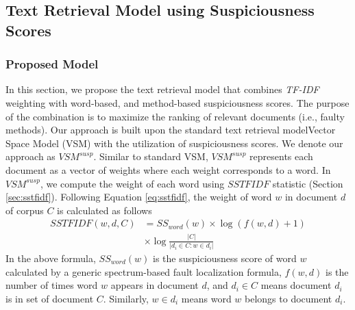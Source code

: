
\subsection{Text Retrieval Model using Suspiciousness Scores}




\subsubsection{Proposed Model}

In this section, we propose the text retrieval model that combines \textit{TF-IDF} weighting with word-based, and method-based suspiciousness scores. The purpose of the combination is to maximize the ranking of relevant documents (i.e., faulty methods). Our approach is built upon the standard text retrieval model\textemdash Vector Space Model (VSM) with the utilization of suspiciousness scores. We denote our approach as $VSM^{susp}$. Similar to standard VSM, $VSM^{susp}$ represents each document as a vector of weights where each weight corresponds to a word. In $VSM^{susp}$, we compute the weight of each word using $SSTFIDF$ statistic (Section \ref{sec:sstfidf}). Following Equation  \ref{eq:sstfidf}, the weight of word $w$ in document $d$ of corpus $C$ is calculated as follows
\begin{align*}
SSTFIDF(w,d,C)&=SS_{word}(w)\times \log(f(w,d)+1)\\
&\times \log\frac{|C|}{|{d_i\in C : w \in d_i }|}
\end{align*}
In the above formula, $SS_{word}(w)$ is the suspiciousness score of word $w$ calculated by a generic spectrum-based fault localization formula, $f(w,d)$ is the number of times word $w$ appears in document $d$, and $d_i \in C$ means document $d_i$ is in set of document $C$. Similarly, $w \in d_i$ means word $w$ belongs to document $d_i$.

